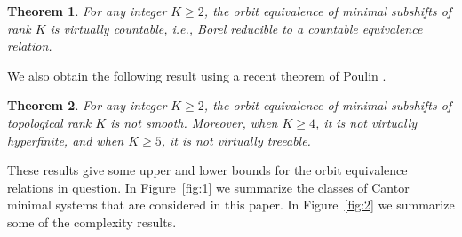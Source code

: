 \documentclass{amsart}
\newtheorem{theorem}{Theorem}[section]
\theoremstyle{definition}
\theoremstyle{problem}
\theoremstyle{remark}
\numberwithin{equation}{section}
\begin{document}
\begin{theorem} \label{thm:main2} For any integer $K\ge 2$, the orbit equivalence of minimal subshifts of rank $K$ is virtually countable, i.e., Borel reducible to a countable equivalence relation.
\end{theorem}

We also obtain the following result using a recent theorem of Poulin \cite[Corollary 1.3]{Poulin}.


\begin{theorem}\label{thm:main3}  For any integer $K\ge2$, the orbit equivalence of minimal subshifts of topological rank $K$ is not smooth. Moreover, when $K\geq 4$, it is not virtually hyperfinite, and when $K\geq 5$, it is not virtually treeable.
\end{theorem}

These results give some upper and lower bounds for the orbit equivalence relations in question.  In Figure~\ref{fig:1} we summarize the classes of Cantor minimal systems that are considered in this paper. In Figure~\ref{fig:2} we summarize some of the complexity results. 
\end{document}
